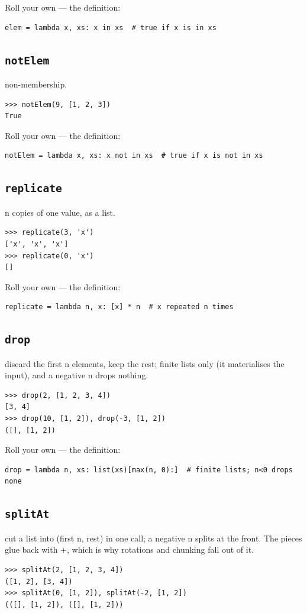 \documentclass[10pt,letterpaper]{book}
\begin{document}
Roll your own --- the definition:

\begin{lstlisting}[style=ex]
elem = lambda x, xs: x in xs  # true if x is in xs
\end{lstlisting}
\subsection{\texttt{notElem}}\label{def:notElem}
non-membership.
\begin{lstlisting}[style=ex]
>>> notElem(9, [1, 2, 3])
True
\end{lstlisting}

Roll your own --- the definition:

\begin{lstlisting}[style=ex]
notElem = lambda x, xs: x not in xs  # true if x is not in xs
\end{lstlisting}
\subsection{\texttt{replicate}}\label{def:replicate}
n copies of one value, as a list.
\begin{lstlisting}[style=ex]
>>> replicate(3, 'x')
['x', 'x', 'x']
>>> replicate(0, 'x')
[]
\end{lstlisting}

Roll your own --- the definition:

\begin{lstlisting}[style=ex]
replicate = lambda n, x: [x] * n  # x repeated n times
\end{lstlisting}
\subsection{\texttt{drop}}\label{def:drop}
discard the first n elements, keep the rest; finite lists only (it materialises the input), and a negative n drops nothing.
\begin{lstlisting}[style=ex]
>>> drop(2, [1, 2, 3, 4])
[3, 4]
>>> drop(10, [1, 2]), drop(-3, [1, 2])
([], [1, 2])
\end{lstlisting}

Roll your own --- the definition:

\begin{lstlisting}[style=ex]
drop = lambda n, xs: list(xs)[max(n, 0):]  # finite lists; n<0 drops none
\end{lstlisting}
\subsection{\texttt{splitAt}}\label{def:splitAt}
cut a list into (first n, rest) in one call; a negative n splits at the front. The pieces glue back with +, which is why rotations and chunking fall out of it.
\begin{lstlisting}[style=ex]
>>> splitAt(2, [1, 2, 3, 4])
([1, 2], [3, 4])
>>> splitAt(0, [1, 2]), splitAt(-2, [1, 2])
(([], [1, 2]), ([], [1, 2]))
\end{lstlisting}
\end{document}
